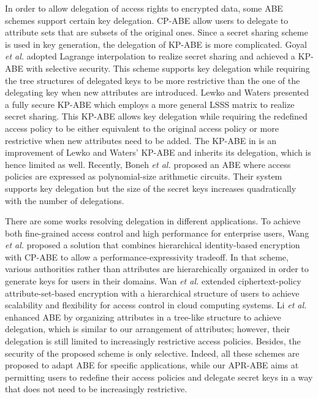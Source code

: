 \documentclass[twocolumn]{svjour3}          \smartqed  \usepackage{graphicx}
\begin{document}
In order to allow delegation of access rights to encrypted data, some ABE schemes support certain key delegation. CP-ABE \cite{BSW07,GJP+08,Wat11} allow users to delegate to attribute sets that are subsets of the original ones. Since a secret sharing scheme is used in key generation, the delegation of KP-ABE is more complicated. Goyal {\it et al.} \cite{GPS+06} adopted Lagrange interpolation to realize secret sharing and achieved a KP-ABE with selective security. This scheme supports key delegation while requiring the tree structures of delegated keys to be more restrictive than the one of the delegating key when new attributes are introduced. Lewko and Waters \cite{LW11} presented a fully secure KP-ABE  which employs a more general LSSS matrix to realize secret sharing. This KP-ABE  allows key delegation while requiring the redefined access policy to be either equivalent to the original access policy or more restrictive when new attributes need to be added. The KP-ABE in \cite{RW13} is an improvement of Lewko and Waters' KP-ABE and inherits its delegation, which
is hence limited as well. Recently, Boneh  {\it et al.} \cite{BNS13} proposed an ABE where access policies are expressed as polynomial-size arithmetic circuits. Their system supports key delegation but the size of the secret keys
increases quadratically with the number of delegations.


There are some works resolving delegation in different applications. To achieve both fine-grained access control and high performance for enterprise users, Wang {\it et al.} \cite{WLW10} proposed a solution that combines
hierarchical identity-based encryption with CP-ABE to allow a performance-expressivity tradeoff. In that scheme, various authorities rather than attributes are hierarchically organized in order to generate keys for users in their domains. Wan  {\it et al.} \cite{WLD12} extended ciphertext-policy attribute-set-based encryption with a hierarchical structure of users to achieve scalability and flexibility for access control in cloud computing systems. Li {\it et al.} \cite{LWW+11} enhanced ABE by organizing attributes in a tree-like structure to achieve delegation, which is similar to our arrangement of attributes; however,
 their delegation is still limited to
increasingly restrictive access policies. Besides, the security
of the proposed scheme is only selective.  Indeed,
all these schemes are proposed to adapt ABE for specific applications,
while our APR-ABE aims at permitting users to redefine their
access policies and delegate secret keys
in a way that does not need to be increasingly restrictive.
\end{document}
